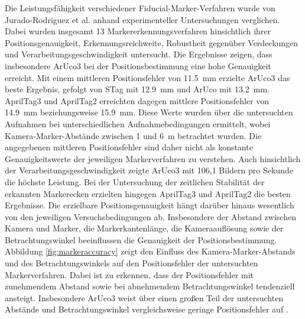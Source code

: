Die Leistungsfähigkeit verschiedener Fiducial-Marker-Verfahren wurde von Jurado-Rodriguez et al. anhand experimenteller Untersuchungen verglichen. Dabei wurden insgesamt 13 Markererkennungsverfahren hinsichtlich ihrer Positionsgenauigkeit, Erkennungsreichweite, Robustheit gegenüber Verdeckungen und Verarbeitungsgeschwindigkeit untersucht. Die Ergebnisse zeigen, dass insbesondere ArUco3 bei der Positionsbestimmung eine hohe Genauigkeit erreicht. Mit einem mittleren Positionsfehler von \SI{11,5}{\milli\metre} erzielte ArUco3 das beste Ergebnis, gefolgt von STag mit \SI{12,9}{\milli\metre} und ArUco mit \SI{13,2}{\milli\metre}. AprilTag3 und AprilTag2 erreichten dagegen mittlere Positionsfehler von \SI{14,9}{\milli\metre} beziehungsweise \SI{15,9}{\milli\metre}. Diese Werte wurden über die untersuchten Aufnahmen bei unterschiedlichen Aufnahmebedingungen ermittelt, wobei Kamera-Marker-Abstände zwischen \num{1} und \SI{6}{\metre} betrachtet wurden. Die angegebenen mittleren Positionsfehler sind daher nicht als konstante Genauigkeitswerte der jeweiligen Markerverfahren zu verstehen. %
Auch hinsichtlich der Verarbeitungsgeschwindigkeit zeigte ArUco3 mit 106,1 Bildern pro Sekunde die höchste Leistung. Bei der Untersuchung der zeitlichen Stabilität der erkannten Markerecken erzielten hingegen AprilTag3 und AprilTag2 die besten Ergebnisse. Die erzielbare Positionsgenauigkeit hängt darüber hinaus wesentlich von den jeweiligen Versuchsbedingungen ab. Insbesondere der Abstand zwischen Kamera und Marker, die Markerkantenlänge, die Kameraauflösung sowie der Betrachtungswinkel beeinflussen die Genauigkeit der Positionsbestimmung. %
Abbildung \ref{fig:markeraccuracy} zeigt den Einfluss des Kamera-Marker-Abstands und des Betrachtungswinkels auf den Positionsfehler der untersuchten Markerverfahren. Dabei ist zu erkennen, dass der Positionsfehler mit zunehmendem Abstand sowie bei abnehmendem Betrachtungswinkel tendenziell ansteigt. Insbesondere ArUco3 weist über einen großen Teil der untersuchten Abstände und Betrachtungswinkel vergleichsweise geringe Positionsfehler auf \cite{JuradoRodriguez2023}. %

